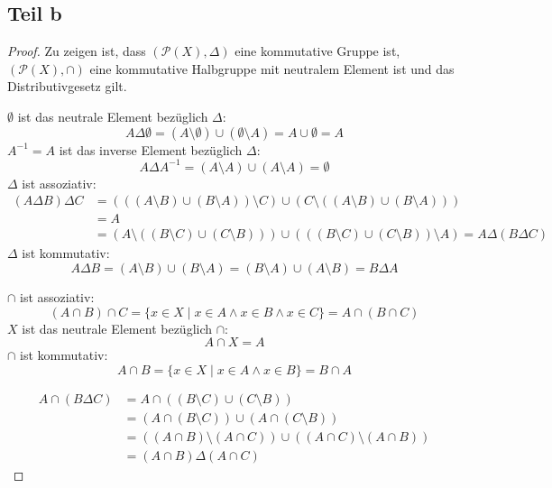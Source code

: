 \documentclass[10pt,a4paper]{article}
\begin{document}
\subsection{Teil b}
\begin{proof}
  Zu zeigen ist, dass $(\mathscr{P}(X), \Delta)$ eine kommutative Gruppe ist, $(\mathscr{P}(X), \cap)$ eine kommutative Halbgruppe mit neutralem Element ist und das Distributivgesetz gilt.
  
  $\emptyset$ ist das neutrale Element bezüglich $\Delta$:
  \begin{equation}
    A \Delta \emptyset = (A \setminus \emptyset) \cup (\emptyset \setminus A) = A \cup \emptyset = A
  \end{equation}
  $A^{-1} = A$ ist das inverse Element bezüglich $\Delta$:
  \begin{equation}
    A \Delta A^{-1} = (A \setminus A) \cup (A \setminus A) = \emptyset
  \end{equation}
  $\Delta$ ist assoziativ:
  \begin{align*}
    (A \Delta B) \Delta C & = (((A \setminus B) \cup (B \setminus A)) \setminus C) \cup (C \setminus ((A \setminus B) \cup (B \setminus A)))\\
    & = A\\
    & = (A \setminus ((B \setminus C) \cup (C \setminus B))) \cup (((B \setminus C) \cup (C \setminus B)) \setminus A) = A \Delta (B \Delta C)
  \end{align*}
  $\Delta$ ist kommutativ:
  \begin{equation}
    A \Delta B = (A \setminus B) \cup (B \setminus A) = (B \setminus A) \cup (A \setminus B) = B \Delta A
  \end{equation}
  
  $\cap$ ist assoziativ:
  \begin{equation}
    (A \cap B) \cap C = \{ x \in X \mid x \in A \land x \in B \land x \in C \} = A \cap (B \cap C)
  \end{equation}
  $X$ ist das neutrale Element bezüglich $\cap$:
  \begin{equation}
    A \cap X = A
  \end{equation}
  $\cap$ ist kommutativ:
  \begin{equation}
    A \cap B = \{ x \in X \mid x \in A \land x \in B \} = B \cap A
  \end{equation}
  
  \begin{align*}
    A \cap (B \Delta C) & = A \cap ((B \setminus C) \cup (C \setminus B))\\
    & = (A \cap (B \setminus C)) \cup (A \cap (C \setminus B))\\
    & = ((A \cap B) \setminus (A \cap C)) \cup ((A \cap C) \setminus (A \cap B))\\
    & = (A \cap B) \Delta (A \cap C)
  \end{align*}
\end{proof}
\end{document}
